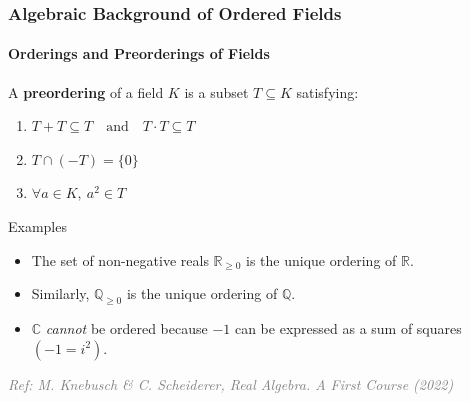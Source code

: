 \documentclass[11pt]{beamer}
\begin{document}
\begin{frame}
    \frametitle{Algebraic Background of Ordered Fields}
    \framesubtitle{Orderings and Preorderings of Fields}
    
    \begin{definition}
        A \textbf{preordering} of a field $K$ is a subset $T \subseteq K$ satisfying:
        \begin{enumerate}[(P1)]
            \setlength{\itemsep}{0.3em}
            \item $T + T \subseteq T \quad \text{and} \quad T \cdot T \subseteq T$
            \item $T \cap (-T) = \{0\}$
            \item $\forall a \in K,\ a^2 \in T$
        \end{enumerate}
    \end{definition}

    \vspace{0.4em}
    \begin{block}{Examples}
        \begin{itemize}
            \setlength{\itemsep}{0.3em}
            \item The set of non-negative reals $\mathbb{R}_{\geq 0} $ is the unique ordering of $\mathbb{R}$.
            \item Similarly, $\mathbb{Q}_{\geq 0}$ is the unique ordering of $\mathbb{Q}$.
            \item $\mathbb{C}$ \emph{cannot} be ordered because $-1$ can be expressed as a sum of squares $(-1 = i^2)$.
        \end{itemize}
    \end{block}

    \vspace*{\fill}
    \hfill \textcolor{gray}{\tiny \textit{Ref: M. Knebusch \& C. Scheiderer, Real Algebra. A First Course (2022)}}
\end{frame}
\end{document}
